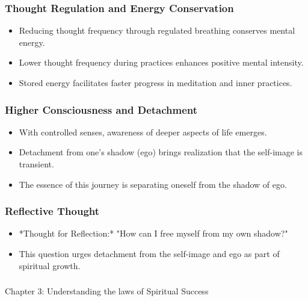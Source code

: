 \begin{frame}[fragile]\frametitle{Thought Regulation and Energy Conservation}
    \begin{itemize}
        \item Reducing thought frequency through regulated breathing conserves mental energy.
        \item Lower thought frequency during practices enhances positive mental intensity.
        \item Stored energy facilitates faster progress in meditation and inner practices.
    \end{itemize}
\end{frame}

\begin{frame}[fragile]\frametitle{Higher Consciousness and Detachment}
    \begin{itemize}
        \item With controlled senses, awareness of deeper aspects of life emerges.
        \item Detachment from one's shadow (ego) brings realization that the self-image is transient.
        \item The essence of this journey is separating oneself from the shadow of ego.
    \end{itemize}
\end{frame}

\begin{frame}[fragile]\frametitle{Reflective Thought}
    \begin{itemize}
        \item *Thought for Reflection:* "How can I free myself from my own shadow?"
        \item This question urges detachment from the self-image and ego as part of spiritual growth.
    \end{itemize}
\end{frame}



\begin{frame}[fragile]\frametitle{}
\begin{center}
{\Large Chapter 3: Understanding the laws of Spiritual Success }
\end{center}
\end{frame}


